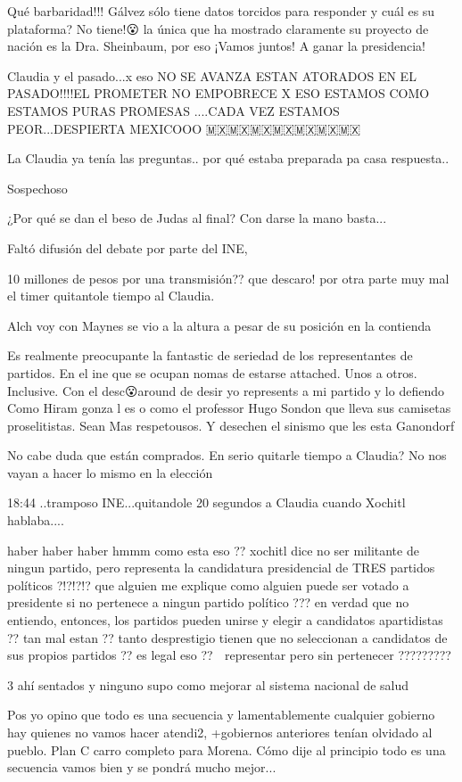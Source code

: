 Qué barbaridad!!! Gálvez sólo tiene datos torcidos para responder y cuál es su plataforma? No tiene!😮 la única que ha mostrado claramente su proyecto de nación es la Dra. Sheinbaum, por eso ¡Vamos juntos! A ganar la presidencia!

Claudia y el pasado...x eso NO SE AVANZA ESTAN ATORADOS EN EL PASADO!!!!EL PROMETER NO EMPOBRECE X ESO ESTAMOS COMO ESTAMOS PURAS PROMESAS ....CADA VEZ ESTAMOS PEOR...DESPIERTA MEXICOOO 🇲🇽🇲🇽🇲🇽🇲🇽🇲🇽🇲🇽🇲🇽

La Claudia ya tenía las preguntas.. por qué estaba preparada pa casa respuesta..

 Sospechoso

¿Por qué se dan el beso de Judas al final? Con darse la mano basta...

Faltó difusión del debate por parte del INE,

10 millones de pesos por una transmisión?? que descaro! por otra parte muy mal el timer quitantole tiempo al Claudia.

Alch voy con Maynes se vio a la altura a pesar de su posición en la contienda

Es realmente  preocupante la fantastic de seriedad de los representantes de partidos. En el ine que se ocupan nomas de estarse attached. Unos a otros.  Inclusive. Con el desc😮around de desir yo represents a mi partido  y lo defiendo  Como Hiram  gonza l es o como  el professor  Hugo  Sondon  que lleva  sus camisetas proselitistas. Sean Mas respetousos. Y desechen el sinismo que les esta Ganondorf

No cabe duda que están comprados. En serio quitarle tiempo a Claudia?
No nos vayan a hacer lo mismo en la elección

18:44 ..tramposo INE...quitandole 20 segundos a Claudia cuando Xochitl hablaba....

haber haber haber hmmm como esta eso ?? xochitl dice no ser militante de ningun partido, pero representa la candidatura presidencial de TRES partidos políticos ?!?!?!? que alguien me explique como alguien puede ser votado a presidente si no pertenece a ningun partido político ??? en verdad que no entiendo, entonces, los partidos pueden unirse y elegir a candidatos apartidistas ?? tan mal estan ?? tanto desprestigio tienen que no seleccionan a candidatos de sus propios partidos ?? es legal eso ?? 🤔 representar pero sin pertenecer ?????????

3 ahí sentados y ninguno supo como mejorar al sistema nacional de salud

Pos yo opino que todo es una secuencia y lamentablemente cualquier gobierno hay quienes no vamos hacer atendi2, +gobiernos anteriores tenían olvidado al pueblo. Plan C carro completo para Morena. Cómo dije al principio todo es una secuencia vamos bien y se pondrá mucho mejor...

